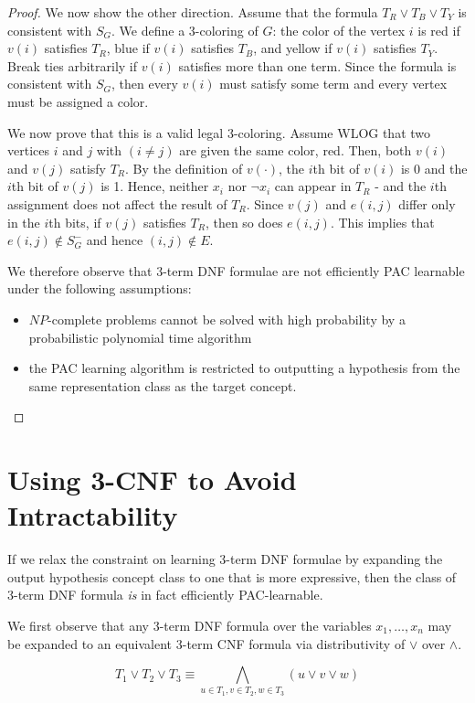 \documentclass{article}
\begin{document}
\begin{proof}
We now show the other direction. Assume that the formula $T_R \vee T_B \vee T_Y$
is consistent with $S_G$. We define a 3-coloring of $G$: the color of the vertex
$i$ is red if $v(i)$ satisfies $T_R$, blue if $v(i)$ satisfies $T_B$, and yellow
if $v(i)$ satisfies $T_Y$. Break ties arbitrarily if $v(i)$ satisfies more than
one term. Since the formula is consistent with $S_G$, then every $v(i)$ must
satisfy some term and every vertex must be assigned a color.

We now prove that
this is a valid legal 3-coloring. Assume WLOG that two vertices $i$ and $j$ with
$(i \neq j)$ are given the same color, red. Then, both $v(i)$ and $v(j)$ satisfy
$T_R$. By the definition of $v(\cdot)$, the $i$th bit of $v(i)$ is 0 and the
$i$th bit of $v(j)$ is 1. Hence, neither $x_i$ nor $\neg x_i$ can appear in
$T_R$ - and the $i$th assignment does not affect the result of $T_R$. Since
$v(j)$ and $e(i,j)$ differ only in the $i$th bits, if $v(j)$ satisfies $T_R$,
then so does $e(i,j)$. This implies that $e(i,j) \not\in S_G^{-}$ and hence
$(i,j) \not\in E$.

We therefore observe that 3-term DNF formulae are not efficiently PAC learnable
under the following assumptions:
\begin{itemize}
    \item $NP$-complete problems cannot be solved with high probability by a
    probabilistic polynomial time algorithm
    \item the PAC learning algorithm is restricted to outputting a hypothesis
    from the same representation class as the target concept.
\end{itemize}

\end{proof}

\section{Using 3-CNF to Avoid Intractability}

If we relax the constraint on learning 3-term DNF formulae by expanding the
output hypothesis concept class to one that is more expressive, then the class
of 3-term DNF formula \emph{is} in fact efficiently PAC-learnable.

We first observe that any 3-term DNF formula over the variables
$x_1, \dots, x_n$ may be expanded to an equivalent 3-term CNF formula via
distributivity of $\vee$ over $\wedge$.

$$T_1 \vee T_2 \vee T_3 \equiv \bigwedge_{u \in T_1, v \in T_2, w \in T_3} (u \vee v \vee w)$$
\end{document}
